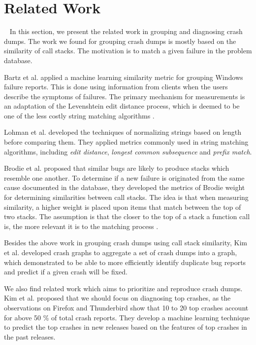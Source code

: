 \section{Related Work}~\label{sec:related}
In this section, we present the related work in grouping and diagnosing crash dumps. The work we found for grouping crash dumps is mostly based on the similarity of call stacks. The motivation is to match a given failure in the problem database\cite{brodie:automated, 4401026, brodie:quickly,Lohman:2005:QFK:1078027.1078461}.

Bartz et al. \cite{Bartz_findingsimilar} applied a machine learning similarity metric for grouping Windows failure reports. This is done using information from clients when the users describe the symptoms of failures. The primary mechanism for measurements is an adaptation of the Levenshtein edit distance process, which is deemed to be one of the less costly string matching algorithms \cite{Bard:2007:STO:1274531.1274545}. 

Lohman et al. \cite{Lohman:2005:QFK:1078027.1078461} developed the techniques of normalizing strings based on length before comparing them. They applied metrics commonly used in string matching algorithms, including {\it edit distance}, {\it longest common subsequence} and {\it prefix match}. 

Brodie et al. \cite{brodie:automated, brodie:quickly} proposed that similar bugs are likely to produce stacks which resemble one another. To determine if a new failure is originated from the same cause documented in the database, they developed the metrics of Brodie weight for determining similarities between call stacks. The idea is that when measuring similarity, a higher weight is placed upon items that match between the top of two stacks. The assumption is that the closer to the top of a stack a function call is, the more relevant it is to the matching process \cite{brodie:quickly}. 

Besides the above work in grouping crash dumps using call stack similarity, Kim et al.\cite{Kim:2011:2} developed crash graphs to aggregate a set of crash dumps into a graph, which demonstrated to be able to more efficiently identify duplicate bug reports and predict if a given crash will be fixed.

We also find related work which aims to prioritize and reproduce crash dumps. Kim et al. \cite{Kim:2011} proposed that we should focus on diagnosing top crashes, as the observations on Firefox and Thunderbird show that 10 to 20 top crashes account for above 50 \% of total crash reports. They develop a machine learning technique to predict the top crashes in new releases based on the features of top crashes in the past releases.

